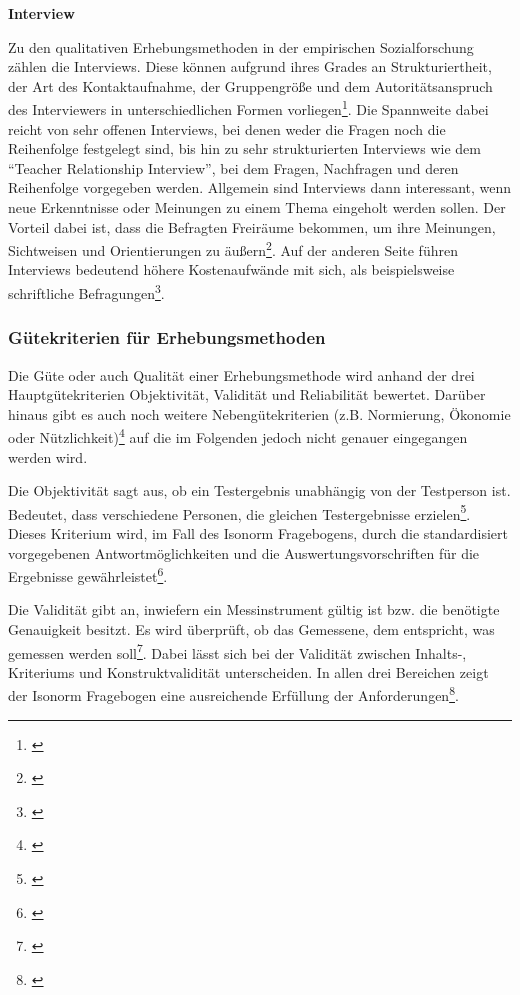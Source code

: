 \textbf{Interview}

Zu den qualitativen Erhebungsmethoden in der empirischen Sozialforschung zählen die Interviews. Diese können aufgrund ihres Grades an Strukturiertheit, der Art des Kontaktaufnahme, der Gruppengröße und dem Autoritätsanspruch des Interviewers in unterschiedlichen Formen vorliegen\footnote{\cite[vgl.][61]{Hegner2003}}. Die Spannweite dabei reicht von sehr offenen Interviews, bei denen weder die Fragen noch die Reihenfolge festgelegt sind, bis hin zu sehr strukturierten Interviews wie dem \enquote{Teacher Relationship Interview}, bei dem Fragen, Nachfragen und deren Reihenfolge vorgegeben werden. Allgemein sind Interviews dann interessant, wenn neue Erkenntnisse oder Meinungen zu einem Thema eingeholt werden sollen. Der Vorteil dabei ist, dass die Befragten Freiräume bekommen, um ihre Meinungen, Sichtweisen und Orientierungen zu äußern\footnote{\cite[vgl.][52\psqq]{Kelle2008}}. Auf der anderen Seite führen Interviews bedeutend höhere Kostenaufwände mit sich, als beispielsweise schriftliche Befragungen\footnote{\cite[vgl.][62\psq]{Hegner2003}}.


\subsubsection{Gütekriterien für Erhebungsmethoden}

Die Güte oder auch Qualität einer Erhebungsmethode wird anhand der drei Hauptgütekriterien Objektivität, Validität und Reliabilität bewertet. Darüber hinaus gibt es auch noch weitere Nebengütekriterien (z.B. Normierung, Ökonomie oder Nützlichkeit)\footnote{\cite[vgl.][Kap. 3.5]{Figl2010}} auf die im Folgenden jedoch nicht genauer eingegangen werden wird.

Die Objektivität sagt aus, ob ein Testergebnis unabhängig von der Testperson ist. Bedeutet, dass verschiedene Personen, die gleichen Testergebnisse erzielen\footnote{\cite[vgl.][Kap. 1]{Himme2007}}. Dieses Kriterium wird, im Fall des Isonorm Fragebogens, durch die standardisiert vorgegebenen Antwortmöglichkeiten und die Auswertungsvorschriften für die Ergebnisse gewährleistet\footnote{\cite[vgl.][Kap. 3.5.1]{Figl2010}}.

Die Validität gibt an, inwiefern ein Messinstrument gültig ist bzw. die benötigte Genauigkeit besitzt. Es wird überprüft, ob das Gemessene, dem entspricht, was gemessen werden soll\footnote{\cite[vgl][Kap. 1]{Himme2007}}. Dabei lässt sich bei der Validität zwischen Inhalts-, Kriteriums und Konstruktvalidität unterscheiden. In allen drei Bereichen zeigt der Isonorm Fragebogen eine ausreichende Erfüllung der Anforderungen\footnote{\cite[vgl.][Kap. 3.5.2]{Figl2010}}.

